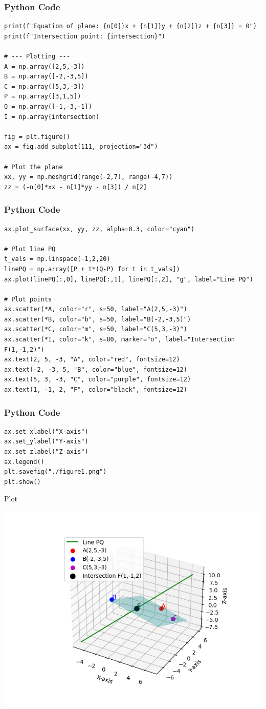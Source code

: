 \documentclass{beamer}
\begin{document}
\begin{frame}[fragile]
    \frametitle{Python Code}
    \begin{lstlisting}
print(f"Equation of plane: {n[0]}x + {n[1]}y + {n[2]}z + {n[3]} = 0")
print(f"Intersection point: {intersection}")

# --- Plotting ---
A = np.array([2,5,-3])
B = np.array([-2,-3,5])
C = np.array([5,3,-3])
P = np.array([3,1,5])
Q = np.array([-1,-3,-1])
I = np.array(intersection)

fig = plt.figure()
ax = fig.add_subplot(111, projection="3d")

# Plot the plane
xx, yy = np.meshgrid(range(-2,7), range(-4,7))
zz = (-n[0]*xx - n[1]*yy - n[3]) / n[2]
    \end{lstlisting}
\end{frame}

\begin{frame}[fragile]
    \frametitle{Python Code}
    \begin{lstlisting}
ax.plot_surface(xx, yy, zz, alpha=0.3, color="cyan")

# Plot line PQ
t_vals = np.linspace(-1,2,20)
linePQ = np.array([P + t*(Q-P) for t in t_vals])
ax.plot(linePQ[:,0], linePQ[:,1], linePQ[:,2], "g", label="Line PQ")

# Plot points
ax.scatter(*A, color="r", s=50, label="A(2,5,-3)")
ax.scatter(*B, color="b", s=50, label="B(-2,-3,5)")
ax.scatter(*C, color="m", s=50, label="C(5,3,-3)")
ax.scatter(*I, color="k", s=80, marker="o", label="Intersection F(1,-1,2)")
ax.text(2, 5, -3, "A", color="red", fontsize=12)
ax.text(-2, -3, 5, "B", color="blue", fontsize=12)
ax.text(5, 3, -3, "C", color="purple", fontsize=12)
ax.text(1, -1, 2, "F", color="black", fontsize=12)
    \end{lstlisting}
\end{frame}

\begin{frame}[fragile]
    \frametitle{Python Code}
    \begin{lstlisting}
ax.set_xlabel("X-axis")
ax.set_ylabel("Y-axis")
ax.set_zlabel("Z-axis")
ax.legend()
plt.savefig("./figure1.png")
plt.show()
    \end{lstlisting}
\end{frame}

\begin{frame}{Plot}
    \begin{center}
        \includegraphics[width=\columnwidth, height=0.8\textheight, keepaspectratio]{figs/figure1.png}
    \end{center}
\end{frame}
\end{document}
